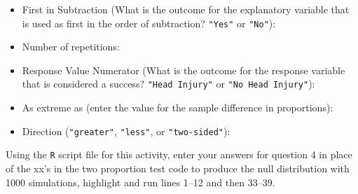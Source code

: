 \documentclass[
]{report}
\providecommand{\tightlist}{%
  \setlength{\itemsep}{0pt}\setlength{\parskip}{0pt}}
\begin{document}
\vspace{.2in}

\begin{itemize}
\tightlist
\item
  First in Subtraction (What is the outcome for the explanatory variable that is used as first in the order of subtraction? \texttt{"Yes"} or \texttt{"No"}):
\end{itemize}

\vspace{.2in}

\begin{itemize}
\tightlist
\item
  Number of repetitions:
\end{itemize}

\vspace{.2in}

\begin{itemize}
\tightlist
\item
  Response Value Numerator (What is the outcome for the response variable that is considered a success? \texttt{"Head\ Injury"} or \texttt{"No\ Head\ Injury"}):
\end{itemize}

\vspace{.2in}

\begin{itemize}
\tightlist
\item
  As extreme as (enter the value for the sample difference in proportions):
\end{itemize}

\vspace{.2in}

\begin{itemize}
\tightlist
\item
  Direction (\texttt{"greater"}, \texttt{"less"}, or \texttt{"two-sided"}):
\end{itemize}

\vspace{.2in}

Using the \texttt{R} script file for this activity, enter your answers for question 4 in place of the xx's in the two proportion test code to produce the null distribution with 1000 simulations, highlight and run lines 1--12 and then 33--39.
\end{document}
